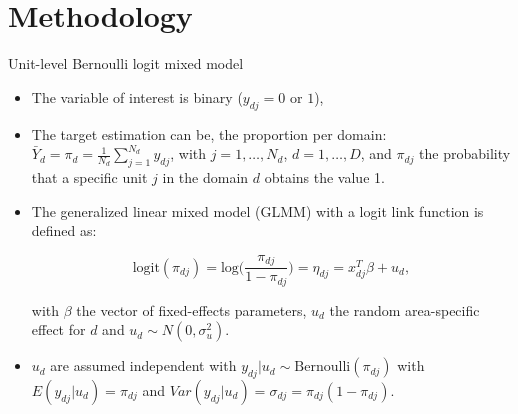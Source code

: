 \documentclass [xcolor=svgnames, t, 9pt] {beamer}
\begin{document}
\section{Methodology}



\begin{frame}{Unit-level Bernoulli logit mixed model}

\begin{itemize}
    \item The variable of interest is binary ($y_{dj} =0$ or $1$), 
 \vspace{0.5cm}   
    \item The target estimation can be, the proportion per domain: 
$\bar{Y}_d = \pi_d = \frac{1}{N_d} \sum_{j=1}^{N_d} y_{dj}$, with $j=1, \dots, N_d$, $d=1, \dots, D$, and $\pi_{dj}$ the probability that a specific unit $j$ in the domain $d$ obtains the value 1. 

\pause

\vspace{0.5cm}

\item The generalized linear mixed model (GLMM) with a logit link function is defined as: 

    \begin{equation*}\label{eq:Plugin1}
        \text{logit}(\pi_{dj}) = \text{log} \Big (   \frac{\pi_{dj}} {1-\pi_{dj}} \Big) = \eta_{dj} = x^T_{dj}\beta + u_d,
    \end{equation*}

with  $\beta$ the vector of fixed-effects parameters, $u_d$ the random area-specific effect for $d$ and $u_d \sim N(0,\sigma_u^2)$.
\vspace{0.5cm}
\item $u_d$ are assumed independent with $y_{dj}|u_d \sim \text{Bernoulli}(\pi_{dj})$ with $E(y_{dj}|u_d) = \pi_{dj}$ and $Var(y_{dj}|u_d) = \sigma_{dj}=\pi_{dj}(1-\pi_{dj})$.
\end{itemize}
\end{frame}
\end{document}
